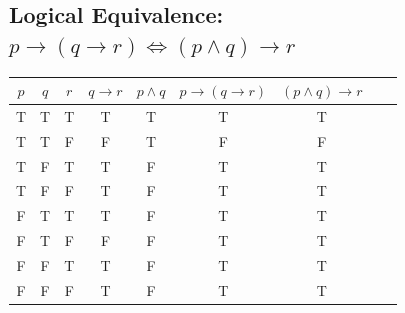\documentclass[a4paper, 10pt]{article}
\begin{document}
        \subsection{Logical Equivalence: \( p \rightarrow (q \rightarrow r) \Leftrightarrow (p \land q) \rightarrow r \)}
            \begin{tabular}{|c|c|c|c|c|c|c|c|c|}
                \hline
                $p$ & $q$ & $r$ & $q \rightarrow r$ & $p \land q$ & $p \rightarrow (q \rightarrow r)$ & $(p \land q) \rightarrow r$ \\ \hline
                T & T & T & T & T & T & T \\ \hline
                T & T & F & F & T & F & F \\ \hline
                T & F & T & T & F & T & T \\ \hline
                T & F & F & T & F & T & T \\ \hline
                F & T & T & T & F & T & T \\ \hline
                F & T & F & F & F & T & T \\ \hline
                F & F & T & T & F & T & T \\ \hline
                F & F & F & T & F & T & T \\ \hline
            \end{tabular}
\end{document}
